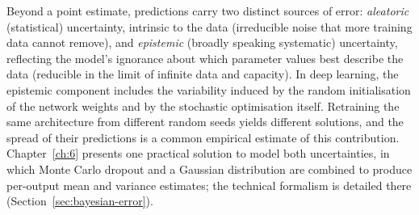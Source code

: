 Beyond a point estimate, predictions carry two distinct sources of error: \textit{aleatoric} (statistical) uncertainty, intrinsic to the data (irreducible noise that more training data cannot remove), and \textit{epistemic} (broadly speaking systematic) uncertainty, reflecting the model's ignorance about which parameter values best describe the data (reducible in the limit of infinite data and capacity).
In deep learning, the epistemic component includes the variability induced by the random initialisation of the network weights and by the stochastic optimisation itself.
Retraining the same architecture from different random seeds yields different solutions, and the spread of their predictions is a common empirical estimate of this contribution.
Chapter~\ref{ch:6} presents one practical solution to model both uncertainties, in which Monte Carlo dropout and a Gaussian distribution are combined to produce per-output mean and variance estimates; the technical formalism is detailed there (Section~\ref{sec:bayesian-error}).


